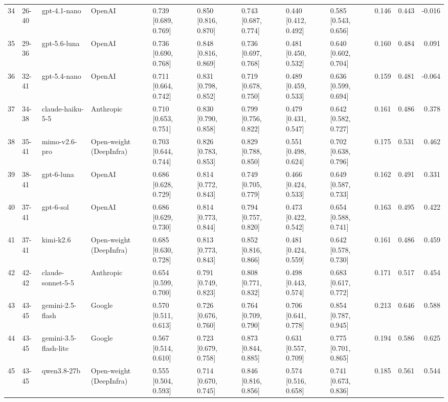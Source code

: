 \begin{table}
\begin{tabular}{rllllllllrrr}
34 & 26-40 & gpt-4.1-nano & OpenAI & 0.739 [0.689, 0.769] & 0.850 [0.816, 0.870] & 0.743 [0.687, 0.774] & 0.440 [0.412, 0.492] & 0.585 [0.543, 0.656] & 0.146 & 0.443 & -0.016 \\
35 & 29-36 & gpt-5.6-luna & OpenAI & 0.736 [0.690, 0.768] & 0.848 [0.816, 0.869] & 0.736 [0.697, 0.768] & 0.481 [0.450, 0.532] & 0.640 [0.602, 0.704] & 0.160 & 0.484 & 0.091 \\
36 & 32-41 & gpt-5.4-nano & OpenAI & 0.711 [0.664, 0.742] & 0.831 [0.798, 0.852] & 0.719 [0.678, 0.750] & 0.489 [0.459, 0.533] & 0.636 [0.599, 0.694] & 0.159 & 0.481 & -0.064 \\
37 & 34-38 & claude-haiku-5-5 & Anthropic & 0.710 [0.653, 0.751] & 0.830 [0.790, 0.858] & 0.799 [0.756, 0.822] & 0.479 [0.431, 0.547] & 0.642 [0.582, 0.727] & 0.161 & 0.486 & 0.378 \\
38 & 35-41 & mimo-v2.6-pro & Open-weight (DeepInfra) & 0.703 [0.644, 0.744] & 0.826 [0.783, 0.853] & 0.829 [0.788, 0.850] & 0.551 [0.498, 0.624] & 0.702 [0.638, 0.796] & 0.175 & 0.531 & 0.462 \\
39 & 38-41 & gpt-6-luna & OpenAI & 0.686 [0.628, 0.729] & 0.814 [0.772, 0.843] & 0.749 [0.705, 0.779] & 0.466 [0.424, 0.533] & 0.649 [0.587, 0.733] & 0.162 & 0.491 & 0.331 \\
40 & 37-41 & gpt-6-sol & OpenAI & 0.686 [0.629, 0.730] & 0.814 [0.773, 0.844] & 0.794 [0.757, 0.820] & 0.473 [0.422, 0.542] & 0.654 [0.588, 0.741] & 0.163 & 0.495 & 0.422 \\
41 & 37-41 & kimi-k2.6 & Open-weight (DeepInfra) & 0.685 [0.630, 0.728] & 0.813 [0.773, 0.843] & 0.852 [0.816, 0.866] & 0.481 [0.424, 0.559] & 0.642 [0.578, 0.730] & 0.161 & 0.486 & 0.459 \\
42 & 42-42 & claude-sonnet-5-5 & Anthropic & 0.654 [0.599, 0.700] & 0.791 [0.749, 0.823] & 0.808 [0.771, 0.832] & 0.498 [0.443, 0.574] & 0.683 [0.617, 0.772] & 0.171 & 0.517 & 0.454 \\
43 & 43-45 & gemini-2.5-flash & Google & 0.570 [0.511, 0.613] & 0.726 [0.676, 0.760] & 0.764 [0.709, 0.790] & 0.706 [0.641, 0.778] & 0.854 [0.787, 0.945] & 0.213 & 0.646 & 0.588 \\
44 & 43-45 & gemini-3.5-flash-lite & Google & 0.567 [0.514, 0.610] & 0.723 [0.679, 0.758] & 0.873 [0.844, 0.885] & 0.631 [0.557, 0.709] & 0.775 [0.701, 0.865] & 0.194 & 0.586 & 0.625 \\
45 & 43-45 & qwen3.8-27b & Open-weight (DeepInfra) & 0.555 [0.504, 0.593] & 0.714 [0.670, 0.745] & 0.846 [0.816, 0.856] & 0.574 [0.516, 0.658] & 0.741 [0.673, 0.836] & 0.185 & 0.561 & 0.544 \\
\bottomrule
\end{tabular}
\end{table}
